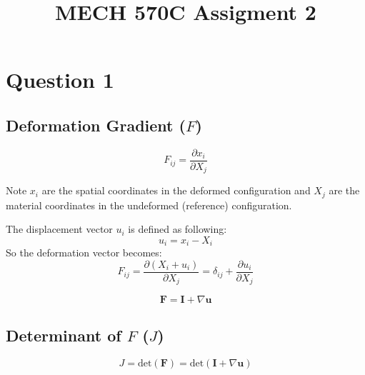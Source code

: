 \documentclass[a4paper,12pt]{article} %
\begin{document}
\setlength{\parskip}{1em} 
\setlength{\parindent}{0pt}
\newcommand{\vect}[1]{\mathbf{#1}}

\title{MECH 570C Assigment 2}

\section{\textbf{Question 1}}


\subsection{Deformation Gradient (\(F\))}

\[ F_{ij} = \frac{\partial x_i}{\partial X_j} \]

Note \(x_i\) are the spatial coordinates in the deformed configuration and \(X_j\) are the material coordinates in the undeformed (reference) configuration.

The displacement vector \(u_i\) is defined as following:
\[ u_i = x_i - X_i \]
So the deformation vector becomes:
\[ F_{ij} = \frac{\partial (X_i + u_i)}{\partial X_j} = \delta_{ij} + \frac{\partial u_i}{\partial X_j} \]

\[ \vect{F} = \vect{I} + \nabla \vect{u} \]


\subsection{Determinant of \(F\) (\(J\))}

\[ J = \text{det}(\vect{F}) = \text{det}(\vect{I} + \nabla \vect{u}) \]
\end{document}
